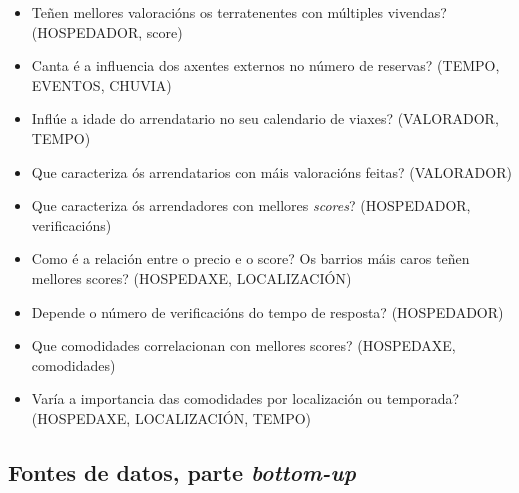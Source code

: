 \documentclass[12pt,a4paper]{article}
\begin{document}
\begin{itemize}
	\item Teñen mellores valoracións os terratenentes con múltiples vivendas? (HOSPEDADOR, score)
	\item Canta é a influencia dos axentes externos no número de reservas? (TEMPO, EVENTOS, CHUVIA)
	\item Inflúe a idade do arrendatario no seu calendario de viaxes? (VALORADOR, TEMPO)
	\item Que caracteriza ós arrendatarios con máis valoracións feitas? (VALORADOR)
	\item Que caracteriza ós arrendadores con mellores \emph{scores}? (HOSPEDADOR, verificacións)
	\item Como é a relación entre o precio e o score? Os barrios máis caros teñen mellores scores? (HOSPEDAXE, LOCALIZACIÓN)
	\item Depende o número de verificacións do tempo de resposta? (HOSPEDADOR)
	\item Que comodidades correlacionan con mellores scores? (HOSPEDAXE, comodidades)
	\item Varía a importancia das comodidades por localización ou temporada? (HOSPEDAXE, LOCALIZACIÓN, TEMPO)
\end{itemize}

\subsection{Fontes de datos, parte \emph{bottom-up}}
\end{document}
